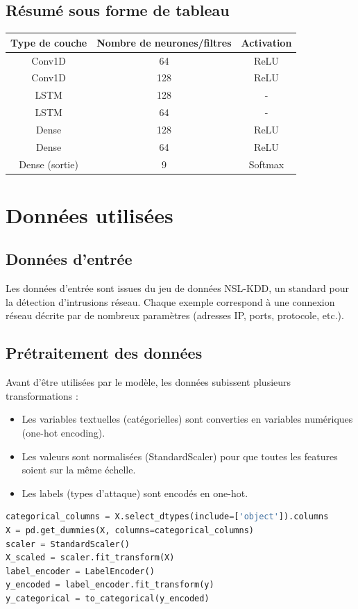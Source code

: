 \documentclass[a4paper,12pt]{article}
\begin{document}
\subsection{Résumé sous forme de tableau}
\begin{tabular}{|c|c|c|}
\hline
Type de couche & Nombre de neurones/filtres & Activation \\
\hline
Conv1D & 64 & ReLU \\
Conv1D & 128 & ReLU \\
LSTM & 128 & - \\
LSTM & 64 & - \\
Dense & 128 & ReLU \\
Dense & 64 & ReLU \\
Dense (sortie) & 9 & Softmax \\
\hline
\end{tabular}

\section{Données utilisées}

\subsection{Données d'entrée}
Les données d'entrée sont issues du jeu de données NSL-KDD, un standard pour la détection d’intrusions réseau. Chaque exemple correspond à une connexion réseau décrite par de nombreux paramètres (adresses IP, ports, protocole, etc.).

\subsection{Prétraitement des données}
Avant d'être utilisées par le modèle, les données subissent plusieurs transformations :
\begin{itemize}
  \item Les variables textuelles (catégorielles) sont converties en variables numériques (one-hot encoding).
  \item Les valeurs sont normalisées (StandardScaler) pour que toutes les features soient sur la même échelle.
  \item Les labels (types d'attaque) sont encodés en one-hot.
\end{itemize}

\begin{lstlisting}[language=Python]
categorical_columns = X.select_dtypes(include=['object']).columns
X = pd.get_dummies(X, columns=categorical_columns)
scaler = StandardScaler()
X_scaled = scaler.fit_transform(X)
label_encoder = LabelEncoder()
y_encoded = label_encoder.fit_transform(y)
y_categorical = to_categorical(y_encoded)
\end{lstlisting}
\end{document}
